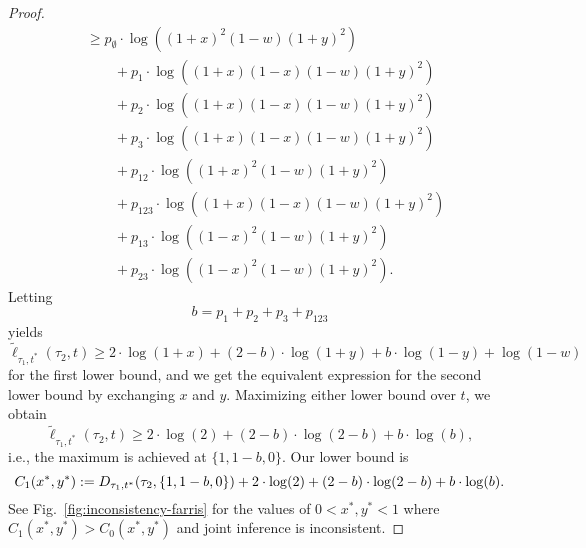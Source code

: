 \begin{proof}
\begin{align*}
    &\ge      p_{\emptyset}  \cdot\log((1+x)^2    (1-w)(1+y)^2) \\
    &\qquad + p_{1}          \cdot\log((1+x)(1-x)(1-w)(1+y)^2) \\
    &\qquad + p_{2}          \cdot\log((1+x)(1-x)(1-w)(1+y)^2) \\
    &\qquad + p_{3}          \cdot\log((1+x)(1-x)(1-w)(1+y)^2) \\
    &\qquad + p_{12}         \cdot\log((1+x)^2    (1-w)(1+y)^2) \\
    &\qquad + p_{123}        \cdot\log((1+x)(1-x)(1-w)(1+y)^2)\\
    &\qquad + p_{13}         \cdot\log((1-x)^2    (1-w)(1+y)^2) \\
    &\qquad + p_{23}         \cdot\log((1-x)^2    (1-w)(1+y)^2).
\end{align*}
Letting
$$
b = p_{1}+p_{2}+p_{3}+p_{123}
$$
yields
$$
    \tilde{\ell}_{\tau_1,t^*}(\tau_2, t)
    \ge      2\cdot\log(1+x)
    + (2-b)  \cdot\log(1+y)
    + b      \cdot\log(1-y)
    + \log(1-w)
$$
for the first lower bound, and we get the equivalent expression for the second lower bound by exchanging $x$ and $y$.
Maximizing either lower bound over $t$, we obtain
$$
\tilde{\ell}_{\tau_1,t^*}(\tau_2, t)
\ge      2\cdot\log(2)
+ (2-b)  \cdot\log(2-b)
+ b      \cdot\log(b),
$$
i.e., the maximum is achieved at $\{1,1-b,0\}$.
Our lower bound is
$$
C_1(x^*, y^*) := D_{\tau_1,t^*}(\tau_2,\{1,1-b,0\}) + 2\cdot\log(2) + (2-b)\cdot\log(2-b) + b\cdot\log(b).
$$
See Fig.~\ref{fig:inconsistency-farris} for the values of $0 < x^*, y^* < 1$ where $C_1(x^*, y^*) > C_0(x^*, y^*)$ and joint inference is inconsistent.
\end{proof}

\restrictedBranchInconsist*

